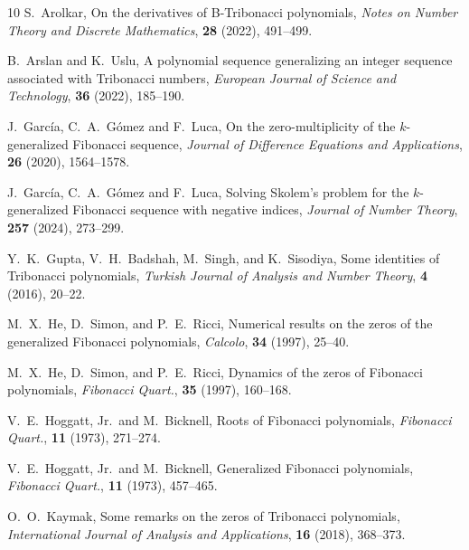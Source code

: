 \documentclass[review]{elsarticle}
\theoremstyle{plain}
\begin{document}

\newpage

\begin{thebibliography}{10}
S.~Arolkar,
On the derivatives of B-Tribonacci polynomials,
\textit{Notes on Number Theory and Discrete Mathematics}, \textbf{28} (2022), 491--499.  

B.~Arslan and K.~Uslu,
A polynomial sequence generalizing an integer sequence associated with Tribonacci numbers,
\textit{European Journal of Science and Technology}, \textbf{36} (2022), 185--190.

J.~Garc{\'i}a, C.~A.~G{\'o}mez and F.~Luca,
On the zero-multiplicity of the $k$-generalized Fibonacci sequence,
\textit{Journal of Difference Equations and Applications}, \textbf{26} (2020), 1564--1578.

J.~Garc{\'i}a, C.~A.~G{\'o}mez and F.~Luca,
Solving Skolem's problem for the $k$-generalized Fibonacci sequence with negative indices,
\textit{Journal of Number Theory}, \textbf{257} (2024), 273--299.

Y.~K.~Gupta, V.~H.~Badshah, M.~Singh, and K.~Sisodiya,
Some identities of Tribonacci polynomials,
\textit{Turkish Journal of Analysis and Number Theory}, \textbf{4} (2016), 20--22.  

M.~X.~He, D.~Simon, and P.~E.~Ricci,
Numerical results on the zeros of the generalized Fibonacci polynomials,
\textit{Calcolo}, \textbf{34} (1997), 25--40.

M.~X.~He, D.~Simon, and P.~E.~Ricci,
Dynamics of the zeros of Fibonacci polynomials, 
\textit{Fibonacci Quart.}, \textbf{35} (1997), 160--168.

V.~E.~Hoggatt, Jr.~and M.~Bicknell,
Roots of Fibonacci polynomials,
\textit{Fibonacci Quart.}, \textbf{11} (1973), 271--274.

V.~E.~Hoggatt, Jr.~and M.~Bicknell,
Generalized Fibonacci polynomials,
\textit{Fibonacci Quart.}, \textbf{11} (1973), 457--465.

O.~O.~Kaymak,
Some remarks on the zeros of Tribonacci polynomials,
\textit{International Journal of Analysis and Applications}, \textbf{16} (2018), 368--373.


\end{thebibliography}
\end{document}
